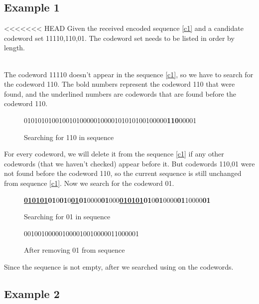 \documentclass[10pt,letterpaper,notitlepage,draft]{article}
\theoremstyle{definition}
\begin{document}
\subsection{Example 1}

<<<<<<< HEAD
Given the received encoded sequence \ref{c1} and a candidate codeword set {11110,110,01}. The codeword set needs to be listed in order by length.

\\

The codeword 11110 doesn't appear in the sequence \ref{c1}, so we have to search for the codeword 110. The bold numbers represent the codeword 110 that were found, and the underlined numbers are codewords that are found before the codeword 110.

\begin{figure}[h!]
\begin{center}
01010101001001010000010000101010100100000{\bf 110}00001
\end{center}
\caption{Searching for 110 in sequence }\label{c2}
\end{figure}

For every codeword, we will delete it from the sequence \ref{c1} if any other codewords (that we haven't checked) appear before it. But codewords {110,01} were not found before the codeword 110, so the current sequence is still unchanged from sequence \ref{c1}. Now we search for the codeword 01. 

\begin{figure}[h!]
\begin{center}
{\bf \underline {010101}01}0{\bf 01}0{\bf\underline{01}01}0000{\bf 01}000{\bf\underline{010101}01}0{\bf 01}0000{\bf 01}10000{\bf 01}
\end{center}
\caption{Searching for 01 in sequence }\label{c3}
\end{figure}

\begin{figure}[h!]
\begin{center}
001001000001000010010000011000001
\end{center}
\caption{After removing 01 from sequence}\label{c3}
\end{figure}

Since the sequence is not empty, after we searched using on the codewords.

\subsection{Example 2}
\end{document}
